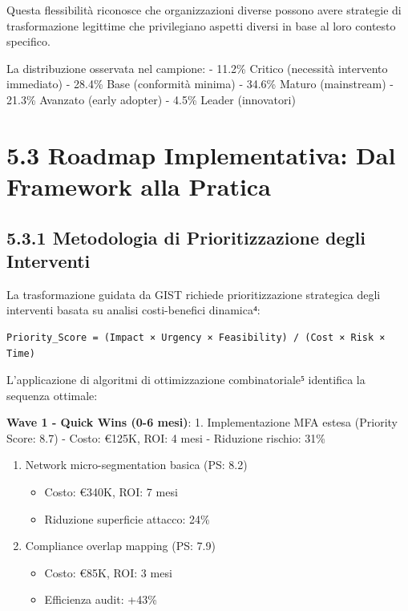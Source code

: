 \documentclass[12pt,a4paper,oneside]{book}
\providecommand{\tightlist}{%
  \setlength{\itemsep}{0pt}\setlength{\parskip}{0pt}
}
\numberwithin{figure}{chapter} %
\numberwithin{table}{chapter}  %
\begin{document}
Questa flessibilità riconosce che organizzazioni diverse possono avere
strategie di trasformazione legittime che privilegiano aspetti diversi
in base al loro contesto specifico.

La distribuzione osservata nel campione: - 11.2\% Critico (necessità
intervento immediato) - 28.4\% Base (conformità minima) - 34.6\% Maturo
(mainstream) - 21.3\% Avanzato (early adopter) - 4.5\% Leader
(innovatori)

\section{5.3 Roadmap Implementativa: Dal Framework alla
Pratica}\label{roadmap-implementativa-dal-framework-alla-pratica}

\subsection{5.3.1 Metodologia di Prioritizzazione degli
Interventi}\label{metodologia-di-prioritizzazione-degli-interventi}

La trasformazione guidata da GIST richiede prioritizzazione strategica
degli interventi basata su analisi costi-benefici dinamica⁴:

\begin{verbatim}
Priority_Score = (Impact × Urgency × Feasibility) / (Cost × Risk × Time)
\end{verbatim}

L'applicazione di algoritmi di ottimizzazione combinatoriale⁵ identifica
la sequenza ottimale:

\textbf{Wave 1 - Quick Wins (0-6 mesi)}: 1. Implementazione MFA estesa
(Priority Score: 8.7) - Costo: €125K, ROI: 4 mesi - Riduzione rischio:
31\%

\begin{enumerate}
\def\labelenumi{\arabic{enumi}.}
\setcounter{enumi}{1}
\tightlist
\item
  Network micro-segmentation basica (PS: 8.2)

  \begin{itemize}
  \tightlist
  \item
    Costo: €340K, ROI: 7 mesi
  \item
    Riduzione superficie attacco: 24\%
  \end{itemize}
\item
  Compliance overlap mapping (PS: 7.9)

  \begin{itemize}
  \tightlist
  \item
    Costo: €85K, ROI: 3 mesi
  \item
    Efficienza audit: +43\%
  \end{itemize}
\end{enumerate}
\end{document}

